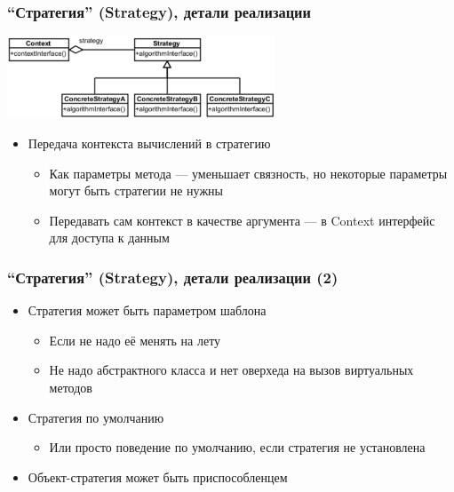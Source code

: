 \documentclass[xetex,mathserif,serif]{beamer}
\begin{document}
	\begin{frame}
		\frametitle{``Стратегия'' (Strategy), детали реализации}
		\begin{center}
			\includegraphics[width=0.6\textwidth]{strategy.png}
		\end{center}
		\begin{itemize}
			\item Передача контекста вычислений в стратегию
			\begin{itemize}
				\item Как параметры метода --- уменьшает связность, но некоторые параметры могут быть стратегии не нужны
				\item Передавать сам контекст в качестве аргумента --- в Context интерфейс для доступа к данным
			\end{itemize}
		\end{itemize}
	\end{frame}

	\begin{frame}
		\frametitle{``Стратегия'' (Strategy), детали реализации (2)}
		\begin{itemize}
			\item Стратегия может быть параметром шаблона
			\begin{itemize}
				\item Если не надо её менять на лету
				\item Не надо абстрактного класса и нет оверхеда на вызов виртуальных методов
			\end{itemize}
			\item Стратегия по умолчанию
			\begin{itemize}
				\item Или просто поведение по умолчанию, если стратегия не установлена
			\end{itemize}
			\item Объект-стратегия может быть приспособленцем
		\end{itemize}
	\end{frame}
\end{document}
